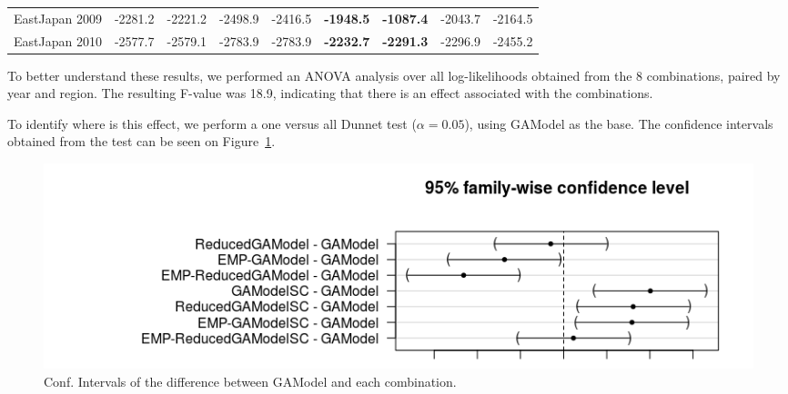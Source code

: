 \begin{table}
\begin{tabular}{|c|c|c|c|c|c|c|c|c|}
    EastJapan 2009 &-2281.2&-2221.2&-2498.9&-2416.5&{\bf-1948.5}&{\bf-1087.4}&-2043.7&-2164.5\\
    EastJapan 2010 &-2577.7&-2579.1&-2783.9&-2783.9&{\bf-2232.7}&{\bf-2291.3}&-2296.9&-2455.2\\
    \hline
  \end{tabular}
\end{table}


To better understand these results, we performed an ANOVA analysis
over all log-likelihoods obtained from the 8 combinations, paired by
year and region. The resulting F-value was 18.9, indicating that there
is an effect associated with the combinations.

To identify where is this effect, we perform a one versus all Dunnet
test ($\alpha = 0.05$), using GAModel as the base. The confidence
intervals obtained from the test can be seen on
Figure~\ref{fig:Dunnet}.

\begin{figure}
  \includegraphics[width=1\textwidth]{img/dunnet}
  \caption{Conf. Intervals of the difference between GAModel and each combination.}
  \label{fig:Dunnet}
\end{figure}

